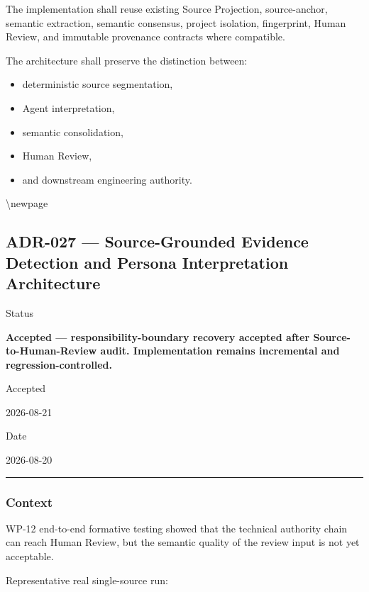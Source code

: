 The implementation shall reuse existing Source Projection, source-anchor, semantic extraction, semantic consensus, project isolation, fingerprint, Human Review, and immutable provenance contracts where compatible.

The architecture shall preserve the distinction between:

\begin{itemize}
\tightlist
\item
  deterministic source segmentation,
\item
  Agent interpretation,
\item
  semantic consolidation,
\item
  Human Review,
\item
  and downstream engineering authority.
\end{itemize}

\textbackslash newpage

\hypertarget{adr-027--source-grounded-evidence-detection-and-persona-interpretation-architecture}{%
\subsection{ADR-027 --- Source-Grounded Evidence Detection and Persona Interpretation Architecture}\label{adr-027--source-grounded-evidence-detection-and-persona-interpretation-architecture}}

Status

\textbf{Accepted --- responsibility-boundary recovery accepted after Source-to-Human-Review audit. Implementation remains incremental and regression-controlled.}

Accepted

2026-08-21

Date

2026-08-20

\begin{center}\rule{0.5\linewidth}{0.5pt}\end{center}

\hypertarget{context-12}{%
\subsubsection{Context}\label{context-12}}

WP-12 end-to-end formative testing showed that the technical authority chain can reach Human Review, but the semantic quality of the review input is not yet acceptable.

Representative real single-source run:

